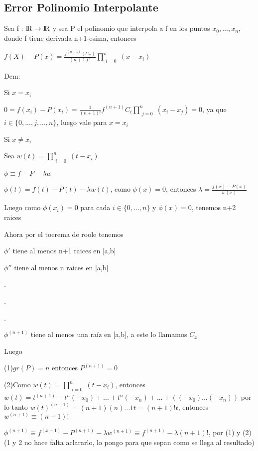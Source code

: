 \documentclass{article}
\begin{document}
\vspace{10mm}

\subsection{Error Polinomio Interpolante}\label{Error-Polinomio-Interpolante}

Sea f : ${\rm I\!R} \rightarrow {\rm I\!R}$ y sea P el polinomio que interpola a f en los puntos $x_0,...,x_n$, donde f tiene derivada n+1-esima, entonces

$f(X)-P(x)= \displaystyle\frac{f^{(n+1)}(C_x)}{(n+1)!} \prod\limits_{\substack{i=0}}^{n} ( x-x_i)$

Dem:

Si $x=x_i$

$0 = f(x_i)-P(x_i) = \displaystyle\frac{1}{(n+1)!} f^{(n+1)}C_i\prod\limits_{\substack{j=0}}^{n} ( x_i-x_j) = 0$, ya que $i \in \{0,...,j,...,n\}$, luego vale para $x=x_i$


Si $x\not=x_i$

Sea $w(t)=\prod\limits_{\substack{i=0}}^{n} (t-x_i)$

$\phi \equiv f-P - \lambda w$

$\phi(t)=f(t)-P(t) - \lambda w(t)$, como $\phi(x)=0$, entonces $\lambda = \displaystyle\frac{f(x)-P(x)}{w(x)}$

Luego como $\phi(x_i) = 0$ para cada $i\in\{ 0,...,n \}$ y $\phi(x)=0$, tenemos n+2 raices

Ahora por el toerema de roole tenemos

$\phi'$ tiene al menos n+1 raices en [a,b]

$\phi''$ tiene al menos n raices en [a,b]

.

.

.

$\phi^{(n+1)}$ tiene al menos una raíz en [a,b], a este lo llamamos $C_x$

Luego

(1)$gr(P) = n$ entonces $P^{(n+1)}=0$

(2)Como $w(t)=\prod\limits_{\substack{i=0}}^{n} (t-x_i)$, entonces $ w(t) = t^{(n+1)} + t^n(-x_0)+...+t^n(-x_n)+...+((-x_0)...(-x_n)) $
por lo tanto $w(t)^{(n+1)}=(n+1)(n)...1t=(n+1)!t$, entonces $w^{(n+1)} \equiv (n+1)!$

$\phi^{(n+1)} \equiv f^{(x+1)} - P^{(n+1)}-\lambda w^{(n+1)} \equiv f^(n+1) - \lambda(n+1)! $, por (1) y (2)(1 y 2 no hace falta aclararlo, lo pongo para que sepan como se llega al resultado)
\end{document}
